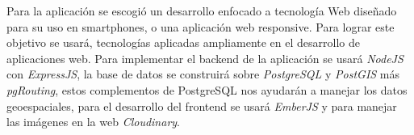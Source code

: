 
Para la aplicación se escogió un desarrollo enfocado a tecnología Web diseñado para su uso en smartphones, o una aplicación web responsive. Para lograr este objetivo se usará, tecnologías aplicadas ampliamente en el desarrollo de aplicaciones web.
Para implementar el backend de la aplicación se usará \emph{NodeJS} con \emph{ExpressJS}, la base de datos se construirá sobre \emph{PostgreSQL} y \emph{PostGIS} más \emph{pgRouting}, estos complementos de PostgreSQL nos ayudarán a manejar los datos geoespaciales, para el desarrollo del frontend se usará \emph{EmberJS} y para manejar las imágenes en la web \emph{Cloudinary}.\\

